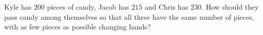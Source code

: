 Kyle has $200$ pieces of candy, Jacob has $215$ and Chris has $230$. How should they pass candy among themselves so that all three have the same number of pieces, with as few pieces as possible changing hands?
